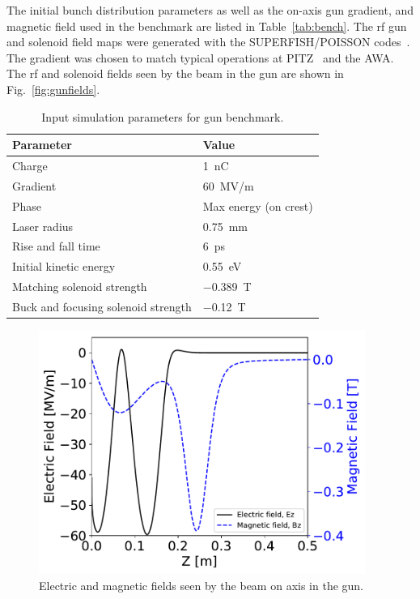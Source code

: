 The initial bunch distribution parameters as well as the 
on-axis gun gradient, and magnetic field used in 
the benchmark are listed in Table~\ref{tab:bench}. 
The rf gun and solenoid field maps were generated 
with the SUPERFISH/POISSON  codes~\cite{superfish}.
The gradient was chosen to match typical operations at PITZ~\cite{pitz}
and the AWA. The rf and solenoid fields seen by the beam in the gun are shown in Fig.~\ref{fig:gunfields}.
\begin{table}
	\begin{center}
		\begin{tabular}{l l} 
			\toprule
			\textbf{Parameter} & \textbf{Value} \\ 
			\midrule
			Charge & \SI{1}{nC} \\
			\addlinespace[-1em] 
			Gradient & \SI{60}{MV/m} \\
			\addlinespace[-1em] 
			Phase & Max energy (on crest) \\
			\addlinespace[-1em] 
			Laser radius & \SI{0.75}{mm} \\
			\addlinespace[-1em] 
			Rise and fall time & \SI{6}{ps} \\
			\addlinespace[-1em] 
			Initial kinetic energy & \SI{0.55}{eV} \\
			\addlinespace[-1em] 
			Matching solenoid strength & \SI{-0.389}{T} \\
			\addlinespace[-1em] 
			Buck and focusing solenoid strength & \SI{-0.12}{T} \\
			\bottomrule			
		\end{tabular}
	\end{center}
	\caption{Input simulation parameters for gun benchmark.}
\end{table}\label{tab:bench}
\begin{figure}
	\begin{center}
		\includegraphics[width=0.95\textwidth]{images/gun_EM_fields}\caption{Electric and magnetic fields seen by the beam on axis in the gun.}
	\end{center}
\end{figure}\label{fig:gunfields}

